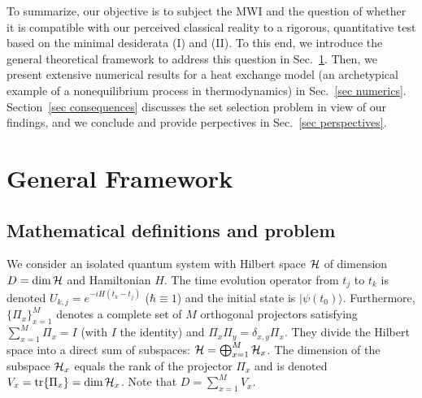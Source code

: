 \documentclass[pre,onecolumn,12pt,aps,longbibliography,nofootinbib]{revtex4-2}
\newcommand{\C}[1]{{\cal{#1}}}
\newcommand{\blue}[1]{#1}
\newcommand{\new}[1]{#1}
\begin{document}
To summarize, our objective is to subject the MWI and the question of whether it is compatible with our perceived classical reality to a rigorous, quantitative test based on the minimal desiderata (I) and (II). To this end, we introduce the general theoretical framework to address this question in Sec.~\ref{sec frame}. Then, we present extensive numerical results for a heat exchange model (an archetypical example of a nonequilibrium process in thermodynamics) in Sec.~\ref{sec numerics}.  Section~\ref{sec consequences} discusses \blue{the set selection problem in view of our findings,} and we conclude and provide perpectives in Sec.~\ref{sec perspectives}.

\section{\new{General Framework}}
\label{sec frame}

\subsection{\new{Mathematical definitions and problem}}
\label{sec math def}

We consider an isolated quantum system with Hilbert space $\C H$ of dimension $D=\dim\C H$ and Hamiltonian $H$. The time evolution operator from $t_j$ to $t_k$ is denoted $U_{k,j} = e^{-iH(t_k-t_j)}$ ($\hbar\equiv1$) and the initial state is $|\psi(t_0)\rangle$. Furthermore, $\{\Pi_x\}_{x=1}^M$ denotes a complete set of $M$ orthogonal projectors satisfying $\sum_{x=1}^M \Pi_x = I$ (with $I$ the identity) and $\Pi_x\Pi_y = \delta_{x,y}\Pi_x$. They divide the Hilbert space into a direct sum of subspaces: $\C H = \bigoplus_{x=1}^M\C H_x$. The dimension of the subspace $\C H_x$ equals the rank of the projector $\Pi_x$ and is denoted $V_x = \mbox{tr}\{\Pi_x\} = \dim\C H_x$. Note that $D = \sum_{x=1}^M V_x$.
\end{document}
